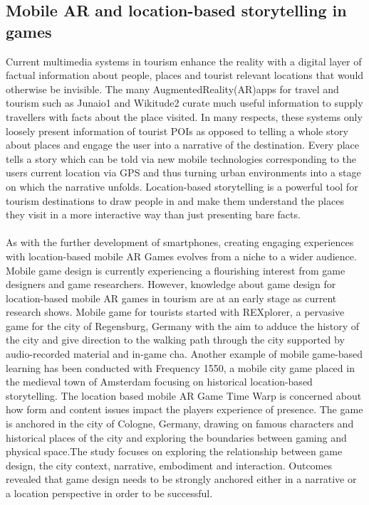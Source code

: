 \subsection{Mobile AR and location-based storytelling in games }
Current multimedia systems in tourism enhance the reality with a digital layer of factual information about people, places and tourist relevant locations that would otherwise be invisible. The many AugmentedReality(AR)apps for travel and tourism such as Junaio1 and Wikitude2 curate much useful information to supply travellers with facts about the place visited. In many respects, these systems only loosely present information of tourist POIs as opposed to telling a whole story about places and engage the user into a narrative of the destination. Every place tells a story which can be told via new mobile technologies corresponding to the users current location via GPS and thus turning urban environments into a stage on which the narrative unfolds. Location-based storytelling is a powerful tool for tourism destinations to draw people in and make them understand the places they visit in a more interactive way than just presenting bare facts. 
\paragraph{}As with the further development of smartphones, creating engaging experiences with location-based mobile AR Games evolves from a niche to a wider audience. Mobile game design is currently experiencing a ﬂourishing interest from game designers and game researchers. However, knowledge about game design for location-based mobile AR games in tourism are at an early stage as current research shows. Mobile game for tourists started with REXplorer, a pervasive game for the city of Regensburg, Germany with the aim to adduce the history of the city and give direction to the walking path through the city supported by audio-recorded material and in-game cha. Another example of mobile game-based learning has been conducted with Frequency 1550, a mobile city game placed in the medieval town of Amsterdam focusing on historical location-based storytelling. The location based mobile AR Game Time Warp is concerned about how form and content issues impact the players experience of presence. The game is anchored in the city of Cologne, Germany, drawing on famous characters and historical places of the city and exploring the boundaries between gaming and physical space.The study focuses on exploring the relationship between game design, the city context, narrative, embodiment and interaction. Outcomes revealed that game design needs to be strongly anchored either in a narrative or a location perspective in order to be successful. 
